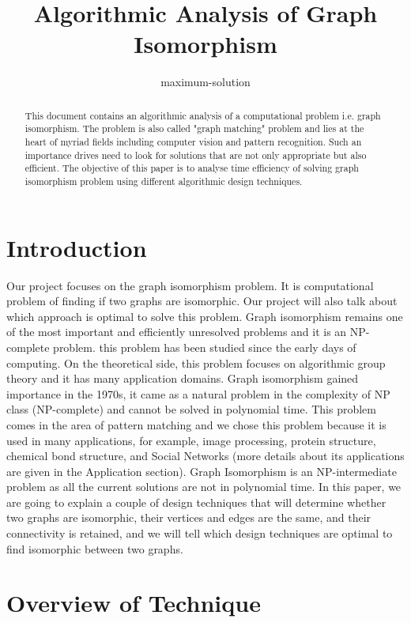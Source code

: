 \documentclass[11pt]{article}
\title{Algorithmic Analysis of Graph Isomorphism}
\author{maximum-solution}
\date{}
\begin{document}
\nolinenumbers
\maketitle
\begin{abstract}
  This document contains an algorithmic analysis of a computational problem i.e. graph isomorphism. The problem is also called "graph matching" problem and lies at the heart of myriad fields including computer vision and pattern recognition. Such an importance drives need to look for solutions that are not only appropriate but also efficient. The objective of this paper is to analyse time efficiency of solving graph isomorphism problem using different algorithmic design techniques.   
\end{abstract}

\section{Introduction}

Our project focuses on the graph isomorphism problem. It is computational problem of finding if two graphs are isomorphic. Our project will also talk about which approach is optimal to solve this problem. Graph isomorphism remains one of the most important and efficiently unresolved problems and it is an NP-complete problem. this problem has been studied since the early days of computing. On the theoretical side, this problem focuses on algorithmic group theory and it has many application domains. Graph isomorphism gained importance in the 1970s, it came as a natural problem in the complexity of NP class (NP-complete) and cannot be solved in polynomial time. This problem comes in the area of pattern matching and we chose this problem because it is used in many applications, for example, image processing, protein structure, chemical bond structure, and Social Networks (more details about its applications are given in the Application section). Graph Isomorphism is an NP-intermediate problem as all the current solutions are not in polynomial time. In this paper, we are going to explain a couple of design techniques that will determine whether two graphs are isomorphic, their vertices and edges are the same, and their connectivity is retained, and we will tell which design techniques are optimal to find isomorphic between two graphs.\\

\section{Overview of Technique}
\end{document}
